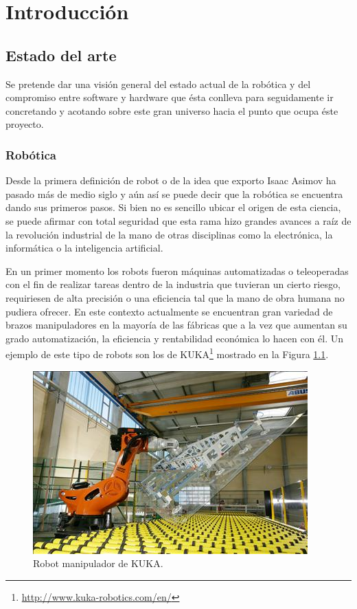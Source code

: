 \documentclass[12pt,a4paper,final,twoside]{book}
\begin{document}
\chapter{Introducción}
\thispagestyle{fancy}
 
\section{Estado del arte}\label{estatdelart}
Se pretende dar una visión general del estado actual de la robótica y del compromiso entre software y hardware que ésta conlleva para seguidamente ir concretando y acotando sobre este gran universo hacia el punto que ocupa éste proyecto. 

\subsection{Robótica}

Desde la primera definición de robot o de la idea que exporto Isaac Asimov ha pasado más de medio siglo y aún así se puede decir que la robótica se encuentra dando sus primeros pasos. Si bien no es sencillo ubicar el origen de esta ciencia, se puede afirmar con total seguridad que esta rama hizo grandes avances a raíz de la revolución industrial de la mano de otras disciplinas como la electrónica, la informática o la inteligencia artificial.

En un primer momento los robots fueron máquinas automatizadas o teleoperadas con el fin de realizar tareas dentro de la industria que tuvieran un cierto riesgo, requiriesen de alta precisión o una eficiencia tal que la mano de obra humana no pudiera ofrecer. En este contexto actualmente se encuentran gran variedad de brazos manipuladores en la mayoría de las fábricas que a la vez que aumentan su grado automatización, la eficiencia y rentabilidad económica lo hacen con él\cite{libroblanco}. Un ejemplo de este tipo de robots son los de KUKA\footnote{\url{http://www.kuka-robotics.com/en/}} mostrado en la Figura \ref{fig:kuka}.
 
\begin{figure}[h!]
	\centering
    \includegraphics[scale=3]	{images/kuka.jpg}
	 \caption{Robot manipulador de KUKA.}
  \label{fig:kuka}
\end{figure}
\end{document}
